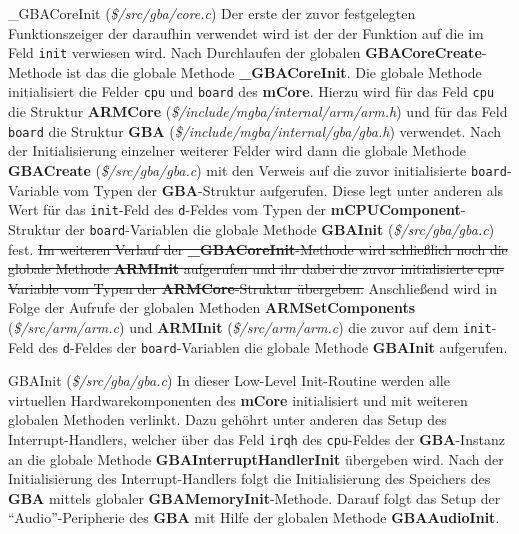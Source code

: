 \documentclass[11pt,a4paper]{scrartcl}
\begin{document}
\vspace{5mm}
\large {\_}GBACoreInit \normalsize(\textit{\$/src/gba/core.c})
\vspace{2mm}\newline
Der erste der zuvor festgelegten Funktionszeiger der daraufhin verwendet wird ist der der Funktion auf die im Feld \verb|init| verwiesen wird. Nach Durchlaufen der globalen \textbf{GBACoreCreate}-Methode ist das die globale Methode \textbf{{\_}GBACoreInit}. Die globale Methode initialisiert die Felder \verb|cpu| und \verb|board| des \textbf{mCore}. Hierzu wird f\"ur das Feld \verb|cpu| die Struktur \textbf{ARMCore} (\textit{\$/include/mgba/internal/arm/arm.h}) und f\"ur das Feld \verb|board| die Struktur \textbf{GBA} (\textit{\$/include/mgba/internal/gba/gba.h}) verwendet. Nach der Initialisierung einzelner weiterer Felder wird dann die globale Methode \textbf{GBACreate} (\textit{\$/src/gba/gba.c}) mit den Verweis auf die zuvor initialisierte \verb|board|-Variable vom Typen der \textbf{GBA}-Struktur aufgerufen. Diese legt unter anderen als Wert f\"ur das \verb|init|-Feld des \verb|d|-Feldes vom Typen der \textbf{mCPUComponent}-Struktur der \verb|board|-Variablen die globale Methode \textbf{GBAInit} (\textit{\$/src/gba/gba.c}) fest. \sout{Im weiteren Verlauf der \textbf{{\_}GBACoreInit}-Methode wird schlie{\ss}lich noch die globale Methode \textbf{ARMInit} aufgerufen und ihr dabei die zuvor initialisierte cpu-Variable vom Typen der \textbf{ARMCore}-Struktur \"ubergeben.} Anschlie{\ss}end wird in Folge der Aufrufe der globalen Methoden \textbf{ARMSetComponents} (\textit{\$/src/arm/arm.c}) und \textbf{ARMInit} (\textit{\$/src/arm/arm.c}) die zuvor auf dem \verb|init|-Feld des \verb|d|-Feldes der \verb|board|-Variablen die globale Methode \textbf{GBAInit} aufgerufen.

\vspace{5mm}
\large GBAInit \normalsize(\textit{\$/src/gba/gba.c})
\vspace{2mm}\newline
In dieser Low-Level Init-Routine werden alle virtuellen Hardwarekomponenten des \textbf{mCore} initialisiert und mit weiteren globalen Methoden verlinkt. Dazu geh\"ohrt unter anderen das Setup des Interrupt-Handlers, welcher \"uber das Feld \verb|irqh| des \verb|cpu|-Feldes der \textbf{GBA}-Instanz an die globale Methode \textbf{GBAInterruptHandlerInit} \"ubergeben wird. Nach der Initialisierung des Interrupt-Handlers folgt die Initialisierung des Speichers des \textbf{GBA} mittels globaler \textbf{GBAMemoryInit}-Methode. Darauf folgt das Setup der \enquote{Audio}-Peripherie des \textbf{GBA} mit Hilfe der globalen Methode \textbf{GBAAudioInit}.
\end{document}

